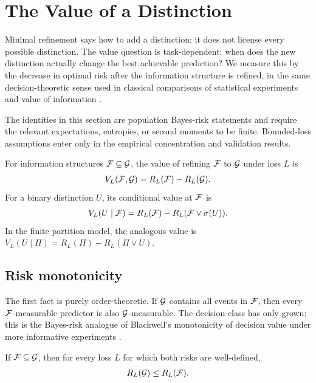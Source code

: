 \section{The Value of a Distinction}
\label{sec:value}

Minimal refinement says how to add a distinction; it does not license every possible distinction. The value question is task-dependent: when does the new distinction actually change the best achievable prediction? We measure this by the decrease in optimal risk after the information structure is refined, in the same decision-theoretic sense used in classical comparisons of statistical experiments and value of information \citep{blackwell1953equivalent,berger1985statistical}.

The identities in this section are population Bayes-risk statements and require the relevant expectations, entropies, or second moments to be finite. Bounded-loss assumptions enter only in the empirical concentration and validation results.

\begin{definition}
\label{def:distinction-value}
For information structures $\mathcal{F}\subseteq\mathcal{G}$, the value of refining $\mathcal{F}$ to $\mathcal{G}$ under loss $L$ is
\begin{align*}
V_L(\mathcal{F},\mathcal{G})=R_L(\mathcal{F})-R_L(\mathcal{G}).
\end{align*}
For a binary distinction $U$, its conditional value at $\mathcal{F}$ is
\begin{align*}
V_L(U\mid\mathcal{F})=R_L(\mathcal{F})-R_L(\mathcal{F}\vee\sigma(U)).
\end{align*}
In the finite partition model, the analogous value is $V_L(U\mid\Pi)=R_L(\Pi)-R_L(\Pi\vee U)$.
\end{definition}

\subsection{Risk monotonicity}

The first fact is purely order-theoretic. If $\mathcal{G}$ contains all events in $\mathcal{F}$, then every $\mathcal{F}$-measurable predictor is also $\mathcal{G}$-measurable. The decision class has only grown; this is the Bayes-risk analogue of Blackwell's monotonicity of decision value under more informative experiments \citep{blackwell1953equivalent}.

\begin{theorem}
\label{thm:risk-monotonicity:informal}
If $\mathcal{F}\subseteq\mathcal{G}$, then for every loss $L$ for which both risks are well-defined,
\begin{align*}
R_L(\mathcal{G})\le R_L(\mathcal{F}).
\end{align*}
\end{theorem}

